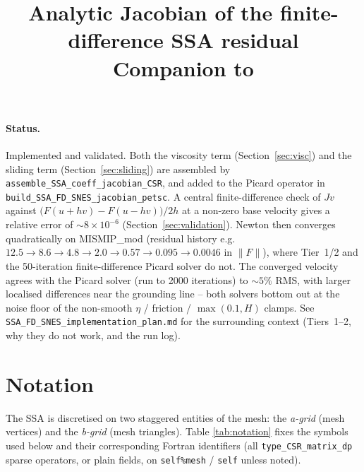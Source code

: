 \documentclass[11pt]{article}
\title{Analytic Jacobian of the finite-difference SSA residual\\[2pt]
\large Companion to \code{momentum\_\allowbreak balance\_\allowbreak solver\_\allowbreak SSA\_\allowbreak FD\_\allowbreak SNES.f90}}
\author{}
\date{}
\newcommand{\code}[1]{\texttt{#1}}
\begin{document}
\maketitle
\vspace{-2.5em}

\paragraph{Status.} Implemented and validated. Both the viscosity term
(Section~\ref{sec:visc}) and the sliding term (Section~\ref{sec:sliding}) are
assembled by \code{assemble\_\allowbreak SSA\_\allowbreak coeff\_\allowbreak jacobian\_\allowbreak CSR}, and added to the
Picard operator in \code{build\_\allowbreak SSA\_\allowbreak FD\_\allowbreak SNES\_\allowbreak jacobian\_\allowbreak petsc}. A central
finite-difference check of $Jv$ against $\big(F(u+hv)-F(u-hv)\big)/2h$ at a
non-zero base velocity gives a relative error of $\sim 8\times10^{-6}$
(Section~\ref{sec:validation}). Newton then converges quadratically on
MISMIP\_\allowbreak mod (residual history e.g.\ $12.5 \to 8.6 \to 4.8 \to 2.0 \to 0.57 \to
0.095 \to 0.0046$ in $\lVert \hat F\rVert$), where Tier~1/2 and the
50-iteration finite-difference Picard solver do not. The converged velocity
agrees with the Picard solver (run to 2000 iterations) to $\sim 5\%$ RMS, with
larger localised differences near the grounding line -- both solvers bottom
out at the noise floor of the non-smooth $\eta$ / friction / $\max(0.1,H)$
clamps. See \code{SSA\_\allowbreak FD\_\allowbreak SNES\_\allowbreak implementation\_\allowbreak plan.md} for the surrounding
context (Tiers~1--2, why they do not work, and the run log).

\tableofcontents

\section{Notation}
\label{sec:notation}

The SSA is discretised on two staggered entities of the mesh: the
\emph{a-grid} (mesh vertices) and the \emph{b-grid} (mesh triangles). Table
\ref{tab:notation} fixes the symbols used below and their corresponding
Fortran identifiers (all \code{type\_\allowbreak CSR\_\allowbreak matrix\_\allowbreak dp} sparse operators, or
plain fields, on \code{self\%mesh} / \code{self} unless noted).
\end{document}
